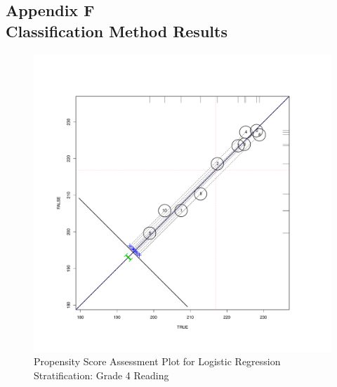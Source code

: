 \documentclass[letterpaper,12p,twoside]{article} %
\begin{document}
\clearpage
{}
\subsection*{Appendix F\\Classification Method Results}

\begin{figure}[h!]
\begin{center}
\includegraphics[height=.4\textheight,width=.4\textheight]{../Figures2009/g4read-circpsa10.pdf}
\caption{Propensity Score Assessment Plot for Logistic Regression Stratification: Grade 4 Reading}
\end{center}
\end{figure}


\end{document}
